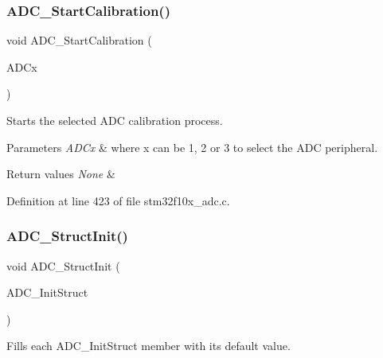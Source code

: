 \subsubsection{\texorpdfstring{A\+D\+C\+\_\+\+Start\+Calibration()}{ADC\_StartCalibration()}}
{\footnotesize\ttfamily void A\+D\+C\+\_\+\+Start\+Calibration (\begin{DoxyParamCaption}\item[{\hyperlink{struct_a_d_c___type_def}{A\+D\+C\+\_\+\+Type\+Def} $\ast$}]{A\+D\+Cx }\end{DoxyParamCaption})}



Starts the selected A\+DC calibration process. 


\begin{DoxyParams}{Parameters}
{\em A\+D\+Cx} & where x can be 1, 2 or 3 to select the A\+DC peripheral. \\
\hline
\end{DoxyParams}

\begin{DoxyRetVals}{Return values}
{\em None} & \\
\hline
\end{DoxyRetVals}


Definition at line 423 of file stm32f10x\+\_\+adc.\+c.

\mbox{\label{group___a_d_c___private___functions_ga6c6e754d1d0a98d56e465efaf73272ec}} 
\subsubsection{\texorpdfstring{A\+D\+C\+\_\+\+Struct\+Init()}{ADC\_StructInit()}}
{\footnotesize\ttfamily void A\+D\+C\+\_\+\+Struct\+Init (\begin{DoxyParamCaption}\item[{\hyperlink{struct_a_d_c___init_type_def}{A\+D\+C\+\_\+\+Init\+Type\+Def} $\ast$}]{A\+D\+C\+\_\+\+Init\+Struct }\end{DoxyParamCaption})}



Fills each A\+D\+C\+\_\+\+Init\+Struct member with its default value. 


